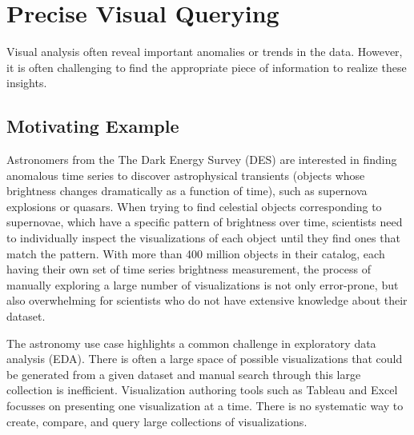 \section{Precise Visual Querying\label{sec:precise}}
Visual analysis often reveal important anomalies or trends in the data\cite{Morton2014}. However, it is often challenging to find the appropriate piece of information to realize these insights.

\subsection{Motivating Example}
Astronomers from the The Dark Energy Survey (DES)\cite{Drlica-Wagner2017} are interested in finding anomalous time series to discover astrophysical transients (objects whose brightness changes dramatically as a function of time), such as supernova explosions or quasars. When trying to find celestial objects corresponding to supernovae, which have a specific pattern of brightness over time, scientists need to individually inspect the visualizations of each object until they find ones that match the pattern. With more than 400 million objects in their catalog, each having their own set of time series brightness measurement, the process of manually exploring a large number of visualizations is not only error-prone, but also overwhelming for scientists who do not have extensive knowledge about their dataset.  
\par The astronomy use case highlights a common challenge in exploratory data analysis (EDA). There is often a large space of possible visualizations that could be generated from a given dataset and manual search through this large collection is inefficient.
Visualization authoring tools such as Tableau and Excel focusses on presenting one visualization at a time. There is no systematic way to create, compare, and query large collections of visualizations. 

